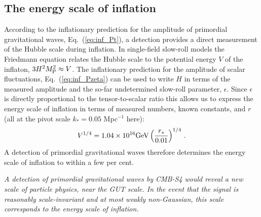 \subsection{The energy scale of inflation}
\label{sec:scale-of-inflation}
According to the inflationary prediction for the amplitude of primordial gravitational waves, Eq.~(\ref{eq:inf_Pt}), a detection provides a direct measurement of the Hubble scale during inflation. In single-field slow-roll models the Friedmann equation relates the Hubble scale to the potential energy $V$ of the inflaton, $3H^2M_{\rm P}^2\approx V$. The inflationary prediction for the amplitude of scalar fluctuations, Eq.~(\ref{eq:inf_Pzeta}) can be used to write $H$ in terms of the measured amplitude and the so-far undetermined slow-roll parameter, $\epsilon$. Since $\epsilon$ is directly proportional to the tensor-to-scalar ratio this allows us to express the energy scale of inflation in terms of measured numbers, known constants, and $r$ (all at the pivot scale $k_\ast=0.05$ Mpc$^{-1}$ here):
\begin{equation}\label{eq:Vofr}
V^{1/4}=1.04\times 10^{16}{\rm GeV}\left(\frac{r_\ast}{0.01}\right)^{1/4}\,.
\end{equation}
A detection of primordial gravitational waves therefore determines the energy scale of inflation to within a few per cent. 

{\it A detection of primordial gravitational waves by CMB-S4 would reveal a new scale of particle physics, near the GUT scale. In the event that the signal is reasonably scale-invariant and at most weakly non-Gaussian, this scale corresponds to the energy scale of inflation.} 


%
